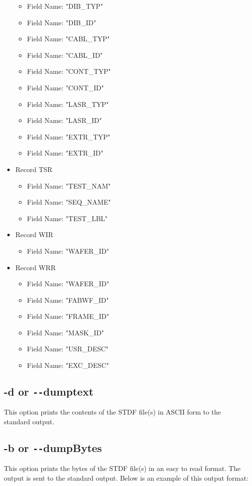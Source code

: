 \documentclass[letterpaper]{article}
\begin{document}
\begin{itemize}
\begin{itemize}
    \item Field Name: "DIB\_TYP"
    \item Field Name: "DIB\_ID"
    \item Field Name: "CABL\_TYP"
    \item Field Name: "CABL\_ID"
    \item Field Name: "CONT\_TYP"
    \item Field Name: "CONT\_ID"
    \item Field Name: "LASR\_TYP"
    \item Field Name: "LASR\_ID"
    \item Field Name: "EXTR\_TYP"
    \item Field Name: "EXTR\_ID"
    \end{itemize}
\item Record TSR
    \begin{itemize}
    \item Field Name: "TEST\_NAM"
    \item Field Name: "SEQ\_NAME"
    \item Field Name: "TEST\_LBL"
    \end{itemize}
\item Record WIR
    \begin{itemize}
    \item Field Name: "WAFER\_ID"
    \end{itemize}
\item Record WRR
    \begin{itemize}
    \item Field Name: "WAFER\_ID"
    \item Field Name: "FABWF\_ID"
    \item Field Name: "FRAME\_ID"
    \item Field Name: "MASK\_ID"
    \item Field Name: "USR\_DESC"
    \item Field Name: "EXC\_DESC"
    \end{itemize}
\end{itemize}

\subsection{\bf -d or \texttt{-{}-}dumptext}
This option prints the contents of the STDF file(s) in ASCII form to the standard output.
\clearpage

\subsection{\bf -b or \texttt{-{}-}dumpBytes}
This option prints the bytes of the STDF file(s) in an easy to read format.
The output is sent to the standard output.  Below is an example of this output format:
\end{document}
